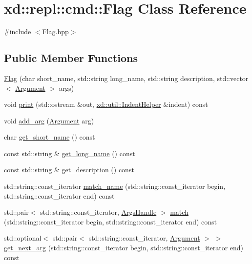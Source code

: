 \hypertarget{classxd_1_1repl_1_1cmd_1_1_flag}{}\section{xd\+:\+:repl\+:\+:cmd\+:\+:Flag Class Reference}
\label{classxd_1_1repl_1_1cmd_1_1_flag}


{\ttfamily \#include $<$Flag.\+hpp$>$}

\subsection*{Public Member Functions}
\begin{DoxyCompactItemize}
\item 
\mbox{\hyperlink{classxd_1_1repl_1_1cmd_1_1_flag_a1e847ab47cbb0d5590a267a89876475d}{Flag}} (char short\+\_\+name, std\+::string long\+\_\+name, std\+::string description, std\+::vector$<$ \mbox{\hyperlink{classxd_1_1repl_1_1cmd_1_1_argument}{Argument}} $>$ args)
\item 
void \mbox{\hyperlink{classxd_1_1repl_1_1cmd_1_1_flag_a4ae9f01469a079faa39701b5be927353}{print}} (std\+::ostream \&out, \mbox{\hyperlink{classxd_1_1util_1_1_indent_helper}{xd\+::util\+::\+Indent\+Helper}} \&indent) const
\item 
void \mbox{\hyperlink{classxd_1_1repl_1_1cmd_1_1_flag_ad60c3d0ab92d2485b0ad217dc03b7763}{add\+\_\+arg}} (\mbox{\hyperlink{classxd_1_1repl_1_1cmd_1_1_argument}{Argument}} arg)
\item 
char \mbox{\hyperlink{classxd_1_1repl_1_1cmd_1_1_flag_a190fcddf2a374189f9b5744bf8eafc99}{get\+\_\+short\+\_\+name}} () const
\item 
const std\+::string \& \mbox{\hyperlink{classxd_1_1repl_1_1cmd_1_1_flag_afa6703e9c82dc5b5e1fa436aec9e1af2}{get\+\_\+long\+\_\+name}} () const
\item 
const std\+::string \& \mbox{\hyperlink{classxd_1_1repl_1_1cmd_1_1_flag_a8c01217a8e62a2dc5b2b739092d7de1e}{get\+\_\+description}} () const
\item 
std\+::string\+::const\+\_\+iterator \mbox{\hyperlink{classxd_1_1repl_1_1cmd_1_1_flag_a094be89588d4e0b307ddd13169d22772}{match\+\_\+name}} (std\+::string\+::const\+\_\+iterator begin, std\+::string\+::const\+\_\+iterator end) const
\item 
std\+::pair$<$ std\+::string\+::const\+\_\+iterator, \mbox{\hyperlink{classxd_1_1repl_1_1cmd_1_1_args_handle}{Args\+Handle}} $>$ \mbox{\hyperlink{classxd_1_1repl_1_1cmd_1_1_flag_a3aef57357e84b70762e90e59285c55ae}{match}} (std\+::string\+::const\+\_\+iterator begin, std\+::string\+::const\+\_\+iterator end) const
\item 
std\+::optional$<$ std\+::pair$<$ std\+::string\+::const\+\_\+iterator, \mbox{\hyperlink{classxd_1_1repl_1_1cmd_1_1_argument}{Argument}} $>$ $>$ \mbox{\hyperlink{classxd_1_1repl_1_1cmd_1_1_flag_a247cb739b67d5de6caf5a836a56184c0}{get\+\_\+next\+\_\+arg}} (std\+::string\+::const\+\_\+iterator begin, std\+::string\+::const\+\_\+iterator end) const
\end{DoxyCompactItemize}


